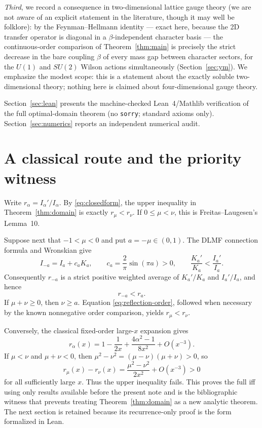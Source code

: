 \documentclass[11pt]{article}
\theoremstyle{remark}
\begin{document}
\emph{Third}, we record a consequence in two-dimensional lattice gauge
theory (we are not aware of an explicit statement in the literature,
though it may well be folklore): by the
Feynman--Hellmann identity --- exact here, because the 2D transfer
operator is diagonal in a $\beta$-independent character basis --- the
continuous-order comparison of Theorem~\ref{thm:main} is precisely the strict decrease in
the bare coupling $\beta$ of every mass gap between character sectors,
for the $U(1)$ and $SU(2)$ Wilson actions simultaneously
(Section~\ref{sec:ym}). We emphasize the modest scope: this is a
statement about the exactly soluble two-dimensional theory; nothing
here is claimed about four-dimensional gauge theory.

Section~\ref{sec:lean} presents the machine-checked Lean~4/Mathlib
verification of the full optimal-domain theorem (no
\texttt{sorry}; standard axioms only).
Section~\ref{sec:numerics} reports an independent numerical audit.

\section{A classical route and the priority witness}
\label{sec:classicalroute}

Write $r_\alpha=I_\alpha'/I_\alpha$.  By
\eqref{eq:closedform}, the upper inequality in
Theorem~\ref{thm:domain} is exactly $r_\mu<r_\nu$.  If
$0\le\mu<\nu$, this is Freitas--Laugesen's Lemma~10.

Suppose next that $-1<\mu<0$ and put $a=-\mu\in(0,1)$.  The DLMF
connection formula and Wronskian \cite[10.27.2, 10.28.2]{DLMF} give
\[
 I_{-a}=I_a+c_aK_a,\qquad c_a=\frac2\pi\sin(\pi a)>0,
 \qquad \frac{K_a'}{K_a}<\frac{I_a'}{I_a}.
\]
Consequently $r_{-a}$ is a strict positive weighted average of
$K_a'/K_a$ and $I_a'/I_a$, and hence
\begin{equation}
\label{eq:reflection-order}
 r_{-a}<r_a.
\end{equation}
If $\mu+\nu\ge0$, then $\nu\ge a$.  Equation
\eqref{eq:reflection-order}, followed when necessary by the known
nonnegative order comparison, yields $r_\mu<r_\nu$.

Conversely, the classical fixed-order large-$x$ expansion
\cite[10.40.1--10.40.4]{DLMF} gives
\[
 r_\alpha(x)=1-\frac1{2x}+
 \frac{4\alpha^2-1}{8x^2}+O(x^{-3}).
\]
If $\mu<\nu$ and $\mu+\nu<0$, then
$\mu^2-\nu^2=(\mu-\nu)(\mu+\nu)>0$, so
\[
 r_\mu(x)-r_\nu(x)
 =\frac{\mu^2-\nu^2}{2x^2}+O(x^{-3})>0
\]
for all sufficiently large $x$.  Thus the upper inequality fails.
This proves the full iff using only results available before the present
note and is the bibliographic witness that prevents treating
Theorem~\ref{thm:domain} as a new analytic theorem.  The next section is
retained because its recurrence-only proof is the form formalized in Lean.
\end{document}
